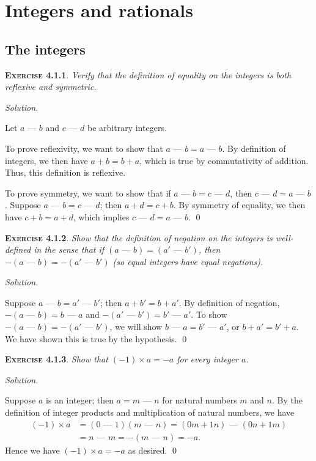 \documentclass[12pt]{article}
\newcommand{\minus}{\textrm{ --- }}
\theoremstyle{remark}
\newenvironment{exer}[2]{
    \noindent \setlength{\parskip}{1em}%
    \textsc{\textbf{Exercise #1}}. \textit{#2} \par
    \noindent \textit{Solution.} %
}{\bigskip}
\begin{document}
\pagebreak

\section{Integers and rationals}
\subsection{The integers}

\begin{exer}{4.1.1}{
    Verify that the definition of equality on the integers is both reflexive and symmetric.
}
    Let $a \minus b$ and $c \minus d$ be arbitrary integers.
    
    To prove reflexivity, we want to show that $a \minus b = a \minus b$.
    By definition of integers, we then have $a + b = b + a$, which is true by commutativity of addition.
    Thus, this definition is reflexive.

    To prove symmetry, we want to show that if $a \minus b = c \minus d$, then $c \minus d = a \minus b$.
    Suppose $a \minus b = c \minus d$; then $a + d = c + b$.
    By symmetry of equality, we then have $c + b = a + d$, which implies $c \minus d = a \minus b$. \qed    
\end{exer}


\begin{exer}{4.1.2}{
    Show that the definition of negation on the integers is well-defined in the sense that if $(a \minus b) = (a' \minus b')$, then $-(a \minus b) = -(a' \minus b')$ (so equal integers have equal negations).
}
    Suppose $a \minus b = a' \minus b'$; then $a + b' = b + a'$.
    By definition of negation, $-(a \minus b) = b \minus a$ and $-(a' \minus b') = b' \minus a'$.
    To show $-(a \minus b) = -(a' \minus b')$, we will show $b \minus a = b' \minus a'$, or $b + a' = b' + a$.
    We have shown this is true by the hypothesis. \qed    
\end{exer}


\begin{exer}{4.1.3}{
    Show that $(-1) \times a = -a$ for every integer $a$.
}
    Suppose $a$ is an integer; then $a = m \minus n$ for natural numbers $m$ and $n$.
    By the definition of integer products and multiplication of natural numbers, we have
    \begin{align*}
        (-1) \times a
        &= (0 \minus 1)(m \minus n)
        = (0m + 1n) \minus (0n + 1m) \\
        &= n \minus m
        = -(m \minus n)
        = -a.
    \end{align*}
    Hence we have $(-1) \times a = -a$ as desired. \qed
\end{exer}
\end{document}
